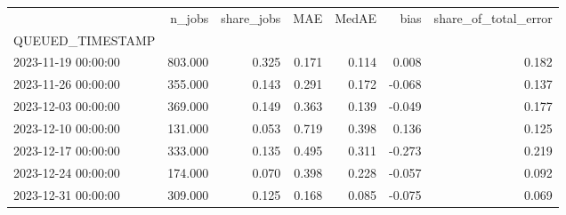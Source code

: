 \begin{tabular}{lrrrrrr}
\toprule
 & n_jobs & share_jobs & MAE & MedAE & bias & share_of_total_error \\
QUEUED_TIMESTAMP &  &  &  &  &  &  \\
\midrule
2023-11-19 00:00:00 & 803.000 & 0.325 & 0.171 & 0.114 & 0.008 & 0.182 \\
2023-11-26 00:00:00 & 355.000 & 0.143 & 0.291 & 0.172 & -0.068 & 0.137 \\
2023-12-03 00:00:00 & 369.000 & 0.149 & 0.363 & 0.139 & -0.049 & 0.177 \\
2023-12-10 00:00:00 & 131.000 & 0.053 & 0.719 & 0.398 & 0.136 & 0.125 \\
2023-12-17 00:00:00 & 333.000 & 0.135 & 0.495 & 0.311 & -0.273 & 0.219 \\
2023-12-24 00:00:00 & 174.000 & 0.070 & 0.398 & 0.228 & -0.057 & 0.092 \\
2023-12-31 00:00:00 & 309.000 & 0.125 & 0.168 & 0.085 & -0.075 & 0.069 \\
\bottomrule
\end{tabular}
